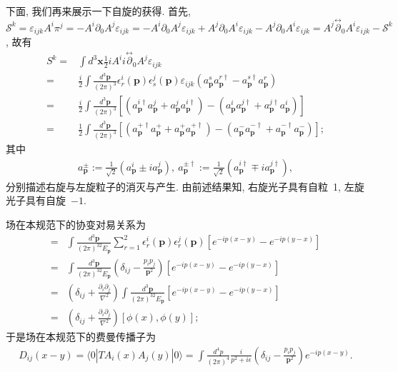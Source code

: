 下面, 我们再来展示一下自旋的获得. 首先, $\mathcal{S}^k=\varepsilon_{ijk}A^i\pi^j=-A^i\partial_0A^j\varepsilon_{ijk}=-A^i\partial_0A^j\varepsilon_{ijk}+A^j\partial_0 A^i\varepsilon_{ijk}-A^j\partial_0 A^i\varepsilon_{ijk}=A^j\overset{\leftrightarrow}{\partial}_0 A^i\varepsilon_{ijk}-\mathcal{S}^k$, 故有
\begin{align}
S^k=&\int d^3\bm{x}\frac{1}{2}iA^i i\overset{\leftrightarrow}{\partial}_0 A^j\varepsilon_{ijk}\nonumber\\
=&\frac{i}{2}\int \frac{d^3\bm{p}}{(2\pi)^3}\epsilon_r^i(\bm{p})\epsilon_s^j(\bm{p})\varepsilon_{ijk}\left(a_{\bm{p}}^sa_{\bm{p}}^{r\dag}-a_{\bm{p}}^{s\dag}a_{\bm{p}}^r\right)\nonumber\\
=&\frac{i}{2}\int \frac{d^3\bm{p}}{(2\pi)^3}\left[(a_{\bm{p}}^{i\dag}a_{\bm{p}}^j+a_{\bm{p}}^ja_{\bm{p}}^{i\dag})-(a_{\bm{p}}^ia_{\bm{p}}^{j\dag}+a_{\bm{p}}^{j\dag}a_{\bm{p}}^i)\right]\nonumber\\
=&\frac{1}{2}\int \frac{d^3\bm{p}}{(2\pi)^3}\left[(a_{\bm{p}}^{+\dag}a_{\bm{p}}^+ +a_{\bm{p}}^+a_{\bm{p}}^{+\dag})-(a_{\bm{p}}^- a_{\bm{p}}^{-\dag}+a_{\bm{p}}^{-\dag}a_{\bm{p}}^-)\right];
\end{align}
其中
\begin{align}
a_{\bm{p}}^\pm:=\frac{1}{\sqrt{2}}(a_{\bm{p}}^i\pm i a_{\bm{p}}^j),~a_{\bm{p}}^{\pm\dag}:=\frac{1}{\sqrt{2}}(a^{i\dag}_{\bm{p}}\mp i a_{\bm{p}}^{j\dag}),
\end{align}
分别描述右旋与左旋粒子的消灭与产生. 由前述结果知, 右旋光子具有自粒~1, 左旋光子具有自旋~$-1$.




场在本规范下的协变对易关系为
\begin{align}
[A_i(x),A_j(y)]=&\int\frac{d^3\bm{p}}{(2\pi)^32E_{\bm{p}}} \sum_{r=1}^2\epsilon^i_r(\bm{p})\epsilon^j_r(\bm{p}) \left[e^{-ip(x-y)}-e^{-ip(y-x)}\right]\nonumber\\
=&\int\frac{d^3\bm{p}}{(2\pi)^32E_{\bm{p}}}\left(\delta_{ij}-\frac{p_ip_j}{\bm{p}^2}\right)\left[e^{-ip(x-y)}-e^{-ip(y-x)}\right]\nonumber\\
=&\left(\delta_{ij}+\frac{\partial_i\partial_j}{\nabla^2}\right)\int\frac{d^3\bm{p}}{(2\pi)^32E_{\bm{p}}}\left[e^{-ip(x-y)}-e^{-ip(y-x)}\right]\nonumber\\
=&\left(\delta_{ij}+\frac{\partial_i\partial_j}{\nabla^2}\right)[\phi(x),\phi(y)];
\end{align}
于是场在本规范下的费曼传播子为
\begin{align}
D_{ij}(x-y)=\langle0|TA_i(x)A_j(y)|0\rangle=\int\frac{d^4p}{(2\pi)^4}\frac{i}{p^2+i\epsilon}\left(\delta_{ij}-\frac{p_ip_j}{\bm{p}^2}\right)e^{-ip(x-y)}.
\end{align}







